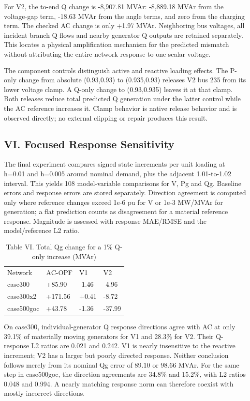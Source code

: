 \documentclass[conference]{IEEEtran}
\begin{document}
For V2, the to-end Q change is -8,907.81 MVAr: -8,889.18 MVAr from the voltage-gap term, -18.63 MVAr from the angle terms, and zero from the charging term. The checked AC change is only +1.97 MVAr. Neighboring bus voltages, all incident branch Q flows and nearby generator Q outputs are retained separately. This locates a physical amplification mechanism for the predicted mismatch without attributing the entire network response to one scalar voltage.

The component controls distinguish active and reactive loading effects. The P-only change from absolute (0.93,0.93) to (0.935,0.93) releases V2 bus 235 from its lower voltage clamp. A Q-only change to (0.93,0.935) leaves it at that clamp. Both releases reduce total predicted Q generation under the latter control while the AC reference increases it. Clamp behavior is native release behavior and is observed directly; no external clipping or repair produces this result.

\subsection*{VI. Focused Response Sensitivity}
The final experiment compares signed state increments per unit loading at h=0.01 and h=0.005 around nominal demand, plus the adjacent 1.01-to-1.02 interval. This yields 108 model-variable comparisons for V, Pg and Qg. Baseline errors and response errors are stored separately. Direction agreement is computed only where reference changes exceed 1e-6 pu for V or 1e-3 MW/MVAr for generation; a flat prediction counts as disagreement for a material reference response. Magnitude is assessed with response MAE/RMSE and the model/reference L2 ratio.

\begin{table}[!ht]\centering\caption{Table VI. Total Qg change for a 1\% Q-only increase (MVAr)}\scriptsize
\begin{tabular}{llll}\toprule
Network & AC-OPF & V1 & V2 \\
case300 & +85.90 & -1.46 & -4.96 \\
case300x2 & +171.56 & +0.41 & -8.72 \\
case500goc & +43.78 & -1.36 & -37.99 \\
\bottomrule\end{tabular}\end{table}
On case300, individual-generator Q response directions agree with AC at only 39.1\% of materially moving generators for V1 and 28.3\% for V2. Their Q-response L2 ratios are 0.021 and 0.242. V1 is nearly insensitive to the reactive increment; V2 has a larger but poorly directed response. Neither conclusion follows merely from its nominal Qg error of 89.10 or 98.66 MVAr. For the same step in case500goc, the direction agreements are 34.8\% and 15.2\%, with L2 ratios 0.048 and 0.994. A nearly matching response norm can therefore coexist with mostly incorrect directions.
\end{document}
